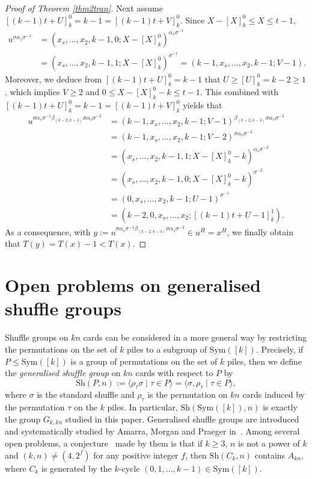 \documentclass[11pt,a4paper,reqno]{amsart}
\newcommand{\A}{A}
\newcommand{\Sym}{\mathrm{Sym}}
\newcommand{\Sh}{\mathrm{Sh}}
\theoremstyle{definition}
\begin{document}
\begin{proof}[Proof of Theorem \ref{thm2tran}]
Next assume $[(k-1)t+U]_{k}^{0}=k-1=[(k-1)t+V]_{k}^{0}$. Since $X-[X]_k^0\leq X\leq t-1$,
\begin{align*}
  u^{\sigma\alpha_s\sigma^{-1}}&= (x_s,\ldots,x_2,k-1,0;X-[X]_k^0)^{\alpha_s\sigma^{-1}}\\
  &= (x_s,\ldots,x_2,k-1,1;X-[X]_k^0)^{\sigma^{-1}}
  = (k-1,x_s,\ldots,x_2,k-1;V-1).
\end{align*}
Moreover, we deduce from $[(k-1)t+U]_{k}^{0}=k-1$ that $U\geq [U]_k^0=k-2\geq 1$, which implies $V\geq2$ and $0\leq X-[X]_k^0-k\leq t-1$. This combined with $[(k-1)t+U]_{k}^{0}=k-1=[(k-1)t+V]_{k}^{0}$ yields that
\begin{align*}
  u^{\sigma\alpha_s\sigma^{-1}\beta_{(k-2,k-3)}\sigma\alpha_s\sigma^{-2}}&
  =(k-1,x_s,\ldots,x_2,k-1;V-1)^{\beta_{(k-2,k-3)}\sigma\alpha_s\sigma^{-2}}\\
  &=(k-1,x_s,\ldots,x_2,k-1;V-2)^{\sigma\alpha_s\sigma^{-2}}\\
  &=(x_s,\ldots,x_2,k-1,1;X-[X]_k^0-k)^{\alpha_s\sigma^{-2}}\\
  &=(x_s,\ldots,x_2,k-1,0;X-[X]_k^0-k)^{\sigma^{-2}}\\
  &=(0,x_s,\ldots,x_2,k-1;U-1)^{\sigma^{-1}}\\
  &=(k-2,0,x_s,\ldots,x_2;[(k-1)t+U-1]_k^1).
\end{align*}
As a consequence, with $y:=u^{\sigma\alpha_s\sigma^{-1}\beta_{(k-2,k-3)}\sigma\alpha_s\sigma^{-2}}\in u^H=x^H$, we finally obtain that $T(y)=T(x)-1<T(x)$.
\end{proof}

\section{Open problems on generalised shuffle groups}\label{sec5}

Shuffle groups on $kn$ cards can be considered in a more general way by restricting the permutations on the set of $k$ piles to a subgroup of $\Sym([k])$. Precisely, if $P\leq \Sym([k])$ is a group of permutations on the set of $k$ piles, then we define the \emph{generalised shuffle group} on $kn$ cards with respect to $P$ by
\[
  \Sh(P,n):=\langle \rho_\tau\sigma \mid \tau\in P\rangle=\langle \sigma, \rho_\tau \mid \tau\in P\rangle,
\]
where $\sigma$ is the standard shuffle and $\rho_\tau$ is the permutation on $kn$ cards induced by the permutation $\tau$ on the $k$ piles.
In particular, $\Sh(\Sym([k]),n)$ is exactly the group $G_{k,kn}$ studied in this paper. Generalised shuffle groups are introduced and systematically studied by Amarra, Morgan and Praeger in~\cite{AMP2021}. Among several open problems, a conjecture~\cite[Conjecture~1.10]{AMP2021} made by them is that if $k\geq3$, $n$ is not a power of $k$ and $(k,n)\neq(4,2^f)$ for any positive integer $f$, then $\Sh(C_k,n)$ contains $\A_{kn}$, where $C_k$ is generated by the $k$-cycle $(0,1,\ldots,k-1)\in \Sym([k])$.
\end{document}
